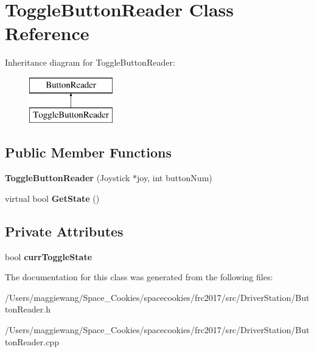 \hypertarget{class_toggle_button_reader}{}\section{Toggle\+Button\+Reader Class Reference}
\label{class_toggle_button_reader}
Inheritance diagram for Toggle\+Button\+Reader\+:\begin{figure}[H]
\begin{center}
\leavevmode
\includegraphics[height=2.000000cm]{class_toggle_button_reader}
\end{center}
\end{figure}
\subsection*{Public Member Functions}
\begin{DoxyCompactItemize}
\item 
\mbox{\label{class_toggle_button_reader_af843241ff4ac0ce1c7806b910465b082}} 
{\bfseries Toggle\+Button\+Reader} (Joystick $\ast$joy, int button\+Num)
\item 
\mbox{\label{class_toggle_button_reader_a9141b60884e4fcef08d8bde89155feff}} 
virtual bool {\bfseries Get\+State} ()
\end{DoxyCompactItemize}
\subsection*{Private Attributes}
\begin{DoxyCompactItemize}
\item 
\mbox{\label{class_toggle_button_reader_a32f620dffec59210d1d90c747a41d5d6}} 
bool {\bfseries curr\+Toggle\+State}
\end{DoxyCompactItemize}


The documentation for this class was generated from the following files\+:\begin{DoxyCompactItemize}
\item 
/\+Users/maggiewang/\+Space\+\_\+\+Cookies/spacecookies/frc2017/src/\+Driver\+Station/Button\+Reader.\+h\item 
/\+Users/maggiewang/\+Space\+\_\+\+Cookies/spacecookies/frc2017/src/\+Driver\+Station/Button\+Reader.\+cpp\end{DoxyCompactItemize}
